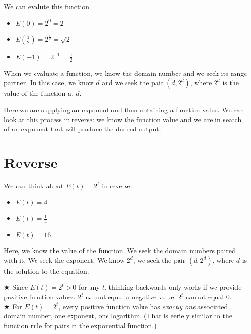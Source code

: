 \documentclass{ximera}
\begin{document}
We can evalute this function:
\begin{itemize}
\item $E(0) = 2^0 = 2$
\item $E\left(\frac{1}{2}\right) = 2^{\tfrac{1}{2}} = \sqrt{2}$
\item $E(-1) = 2^{-1} = \frac{1}{2}$
\end{itemize}


When we evaluate a function, we know the domain number and we seek its range partner. In this case, we know $d$ and we seek the pair $(d, 2^d)$, where $2^d$ is the value of the function at $d$.



Here we are supplying an exponent and then obtaining a function value.  We can look at this process in reverse: we know the function value and we are in search of an exponent that will produce the desired output.









\section{Reverse}

We can think about $E(t) = 2^t$ in reverse.
\begin{itemize}
\item $E(t) = 4$
\item $E(t) = {\tfrac{1}{4}} $
\item $E(t) = 16 $
\end{itemize}


Here, we know the value of the function.  We seek the domain numbers paired with it. We seek the exponent. We know $2^d$, we seek the pair $(d, 2^d)$, where $d$ is the solution to the equation.




\textbf{\textcolor{red!90!darkgray}{$\bigstar$}}  Since $E(t) = 2^t > 0$ for any $t$, thinking backwards only works if we provide positive function values. $2^t$ cannot equal a negative value. $2^t$ cannot equal $0$.   \\ 



\textbf{\textcolor{red!90!darkgray}{$\bigstar$}} For $E(t) = 2^t$, every positive function value has \textit{exactly one} associated domain number, one exponent, one logarithm. (That is eeriely similar to the function rule for pairs in the exponential function.) \\ 
\end{document}

